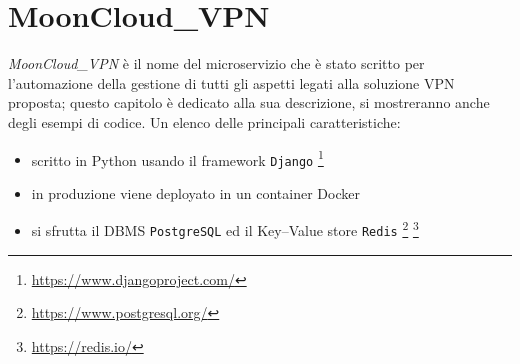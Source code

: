 \chapter{MoonCloud\_VPN}\label{ch:microservice}
\textit{MoonCloud\_VPN} è il nome del microservizio
che è stato scritto per l'automazione della gestione di tutti gli aspetti legati
alla soluzione VPN proposta; questo capitolo è dedicato alla sua descrizione, si
mostreranno anche degli esempi di codice.
Un elenco delle principali caratteristiche:
\begin{itemize}
  \item scritto in Python usando il framework \texttt{Django}
  \footnote{\url{https://www.djangoproject.com/}}
  \item in produzione viene deployato in un container Docker
  \item si sfrutta il DBMS \texttt{PostgreSQL} ed il Key--Value store \texttt{Redis}
  \footnote{\url{https://www.postgresql.org/}} \footnote{\url{https://redis.io/}}
\end{itemize}







